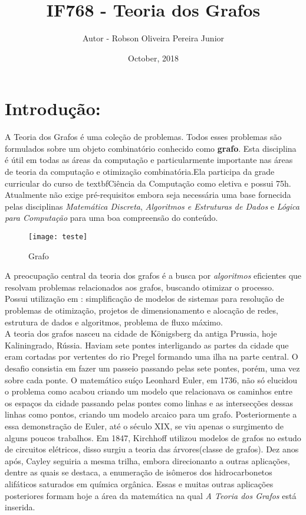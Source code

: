 \documentclass[10pt]{article}
\title{IF768 - Teoria dos Grafos}
\author{Autor - Robson Oliveira Pereira Junior }
\date{October, 2018}
\begin{document}
\maketitle

\section{Introdução:}

 A Teoria dos Grafos é uma coleção de problemas. Todos esses problemas são formulados sobre um objeto combinatório conhecido como \textbf{grafo}.
Esta disciplina é útil em todas as áreas da computação e particularmente importante nas áreas de teoria da computação e otimização combinatória.Ela participa da grade curricular do curso de textbf{Ciência da Computação} como eletiva e possui 75h. Atualmente não exige pré-requisitos embora seja necessária uma base fornecida pelas disciplinas \textit{Matemática Discreta}, \textit{Algoritmos e Estruturas de Dados} e \textit{Lógica para Computação} para uma boa compreensão do conteúdo.\cite{1}\\
\begin{wrapfigure}{l}{0.25\textwidth}
\texttt{[image: teste]} 
\caption{Grafo}
\label{fig:subim1}
\end{wrapfigure}
A preocupação central da teoria dos grafos é a busca por \textit{algoritmos} eficientes que resolvam problemas relacionados aos grafos, buscando otimizar o processo. \cite{disciplina}\\
Possui utilização em : simplificação de modelos de sistemas para resolução de problemas de otimização, projetos de dimensionamento e alocação de redes, estrutura de dados e algoritmos, problema de fluxo máximo.\\
A teoria dos grafos nasceu na cidade de Königsberg da antiga Prussia, hoje Kaliningrado, Rússia. Haviam sete pontes interligando as partes da cidade que eram cortadas por vertentes do rio Pregel formando uma ilha na parte central. O desafio consistia em fazer um passeio passando pelas sete pontes, porém, uma vez sobre cada ponte. O matemático suíço Leonhard Euler, em 1736, não só elucidou o problema como acabou criando um modelo que relacionava os caminhos entre os espaços da cidade passando pelas pontes como linhas e as intersecções dessas linhas como pontos, criando um modelo arcaico para um grafo. Posteriormente a essa demonstração de Euler, até o século XIX, se viu apenas  o surgimento de alguns poucos trabalhos. Em 1847, Kirchhoff utilizou modelos de grafos no estudo de circuitos elétricos, disso surgiu a teoria das árvores(classe de grafos). Dez anos após, Cayley seguiria a mesma trilha, embora direcionanto a outras aplicações, dentre as quais se destaca, a enumeração de isômeros dos hidrocarbonetos alifáticos saturados em química orgânica. Essas e muitas outras aplicações posteriores formam hoje a área da matemática na qual \textit{A Teoria dos Grafos} está inserida.\cite{2}
\end{document}
